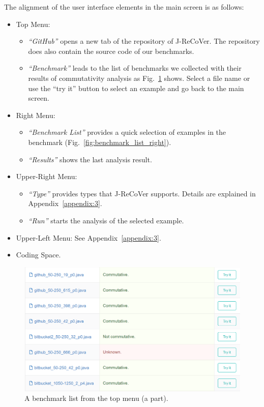 The alignment of the user interface elements in the main screen is as follows:
\begin{itemize}
\item
Top Menu:
\begin{itemize}
\item
\emph{``GitHub''} opens a new tab of the repository of J-ReCoVer. The repository
does also contain the source code of our benchmarks.
\item
\emph{``Benchmark''} leads to the list of benchmarks we collected with their
results of commutativity analysis as Fig.~\ref{fig:benchmark_list} shows. Select
a file name or use the ``try it'' button to select an example and go back to the main screen.
\end{itemize}
\item
Right Menu:
\begin{itemize}
\item
\emph{``Benchmark List''} provides a quick selection of examples in the
benchmark (Fig.~\ref{fig:benchmark_list_right}).
\item
\emph{``Results''} shows the last analysis result.
\end{itemize}
\item
Upper-Right Menu:
\begin{itemize}
\item
\emph{``Type''} provides types that J-ReCoVer supports. Details are explained in
Appendix~\ref{appendix:3}.
\item
\emph{``Run''} starts the analysis of the selected example.
\end{itemize}
\item
Upper-Left Menu: See Appendix~\ref{appendix:3}.
\item
Coding Space.
\end{itemize}

\begin{figure}
\begin{center}
\includegraphics[width=.8\linewidth]{screenshots/benchmark_list}
\caption{A benchmark list from the top menu (a part).}
\label{fig:benchmark_list}
\end{center}
\end{figure}


